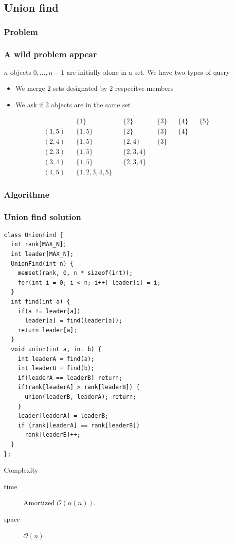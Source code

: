 \documentclass[10pt,svgnames,usenames,table]{beamer} %
\newcommand{\bigoh}{\mathcal{O}}
\begin{document}
\subsection{Union find}
\subsubsection{Problem}
\begin{frame}
  \frametitle{A wild problem appear}
  $n$ objects $0, \ldots, n-1$ are initially alone in a set.
  We have two types of query
  \begin{itemize}
    \item We merge 2 sets designated by 2 respecitve members
    \item We ask if 2 objects are in the same set
  \end{itemize}
  \begin{align*}
    && \{1\} && \{2\} && \{3\} && \{4\} && \{5\}\\
    (1,5) && \{1,5\} && \{2\} && \{3\} && \{4\}\\
    (2,4) && \{1,5\} && \{2,4\} && \{3\}\\
    (2,3) && \{1,5\} && \{2,3,4\}\\
    (3,4) && \{1,5\} && \{2,3,4\}\\
    (4,5) && \{1,2,3,4,5\}
  \end{align*}
\end{frame}
\subsubsection{Algorithme}
\begin{frame}
  \frametitle{Union find solution}
  \begin{lstlisting}
class UnionFind {
  int rank[MAX_N];
  int leader[MAX_N];
  UnionFind(int n) {
    memset(rank, 0, n * sizeof(int));
    for(int i = 0; i < n; i++) leader[i] = i;
  }
  int find(int a) {
    if(a != leader[a])
      leader[a] = find(leader[a]);
    return leader[a];
  }
  void union(int a, int b) {
    int leaderA = find(a);
    int leaderB = find(b);
    if(leaderA == leaderB) return;
    if(rank[leaderA] > rank[leaderB]) {
      union(leaderB, leaderA); return;
    }
    leader[leaderA] = leaderB;
    if (rank[leaderA] == rank[leaderB])
      rank[leaderB]++;
  }
};
  \end{lstlisting}
  \framebreak
  \begin{block}{Complexity}
    \begin{description}
      \item[time] Amortized $\bigoh(\alpha(n))$.
      \item[space] $\bigoh(n)$.
    \end{description}
  \end{block}
\end{frame}
\end{document}
